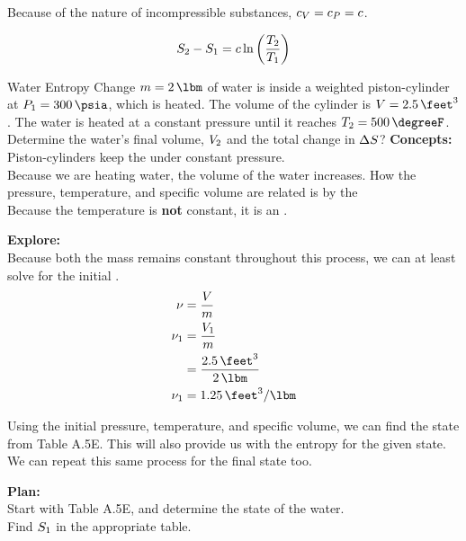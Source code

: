 Because of the nature of incompressible substances, $c_{V} = c_{P} = c$.

\begin{equation}\label{eq:Entropy_Change-Incompressible_Substances}
  S_{2} - S_{1} = c \ln \left( \frac{T_{2}}{T_{1}} \right)
\end{equation}

\begin{example}{Water Entropy Change}
  $\Mass = \SI{2}{\lbm}$ of water is inside a weighted piston-cylinder at $\Pressure_{1} = \SI{300}{\psia}$, which is heated.
  The volume of the cylinder is $\Volume = \SI{2.5}{\feet\cubed}$.
  The water is heated at a constant pressure until it reaches $\Temp_{2} = \SI{500}{\degreeF}$.
  Determine the water's final volume, $V_{2}$ and the total change in  $\Delta S$?
  \tcblower{}
  \textbf{Concepts:} \\
  Piston-cylinders keep the  under constant pressure. \\
  Because we are heating water, the volume of the water increases.
  How the pressure, temperature, and specific volume are related is by the \\
  Because the temperature is \textbf{not} constant, it is an .

  \textbf{Explore:} \\
  Because both the mass remains constant throughout this process, we can at least solve for the initial .
  \begin{align*}
    \SpecificVolume &= \frac{\Volume}{\Mass} \\
    \SpecificVolume_{1} &= \frac{\Volume_{1}}{\Mass} \\
                    &= \frac{\SI{2.5}{\feet\cubed}}{\SI{2}{\lbm}} \\
    \SpecificVolume_{1} &= \SI{1.25}{\feet\cubed\per\lbm}
  \end{align*}

  Using the initial pressure, temperature, and specific volume, we can find the state from Table A.5E.
  This will also provide us with the entropy for the given state. \\
  We can repeat this same process for the final state too.

  \textbf{Plan:} \\
  Start with Table A.5E, and determine the state of the water. \\
  Find $S_{1}$ in the appropriate table.


\end{example}

